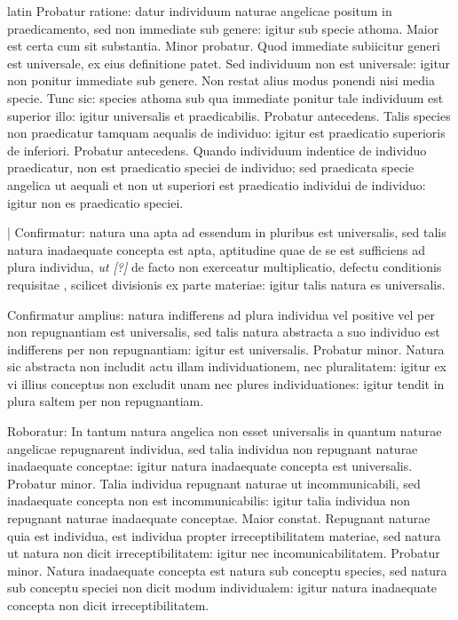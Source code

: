 \begin{otherlanguage*}{latin}
\pstart
 Probatur ratione: datur individuum naturae angelicae positum in praedicamento, sed non immediate sub genere: igitur sub specie athoma. Maior est certa cum sit substantia. Minor probatur. Quod immediate subiicitur generi est universale, ex eius definitione patet. Sed individuum non est universale: igitur non ponitur immediate sub genere. Non restat alius modus ponendi nisi media specie. Tunc sic: species athoma sub qua immediate ponitur tale individuum est superior illo: igitur universalis et praedicabilis. Probatur antecedens. Talis species non praedicatur tamquam aequalis de individuo: igitur est praedicatio superioris de inferiori. Probatur antecedens. Quando individuum indentice de individuo praedicatur, non est praedicatio speciei de individuo; sed praedicata specie angelica ut aequali et non ut superiori est praedicatio individui de individuo: igitur non es praedicatio speciei. 
\pend

\pstart
 \textnormal{|}   Confirmatur: natura una apta ad essendum  in pluribus est universalis, sed talis natura inadaequate concepta est apta, aptitudine quae de se est sufficiens ad plura individua, \emph{ut [?]} de facto non exerceatur multiplicatio, defectu conditionis requisitae , scilicet divisionis ex parte materiae: igitur talis natura es universalis. 
\pend

\pstart
 Confirmatur amplius: natura indifferens ad plura individua vel positive vel per non repugnantiam est universalis, sed talis natura abstracta a suo individuo est indifferens per non repugnantiam: igitur est universalis. Probatur minor. Natura sic abstracta non includit actu illam individuationem, nec pluralitatem: igitur ex vi illius conceptus non excludit unam nec plures individuationes: igitur tendit in plura saltem per non repugnantiam. 
\pend

\pstart
 Roboratur: In tantum natura angelica non esset universalis in quantum naturae angelicae repugnarent individua, sed talia individua non repugnant naturae inadaequate conceptae: igitur natura inadaequate concepta est universalis. Probatur minor. Talia individua repugnant naturae ut incommunicabili, sed inadaequate concepta non est incommunicabilis: igitur talia individua non repugnant naturae inadaequate conceptae. Maior constat. Repugnant naturae quia est individua, est individua propter irreceptibilitatem materiae, sed natura ut natura non dicit irreceptibilitatem: igitur nec incomunicabilitatem. Probatur minor. Natura inadaequate concepta est natura sub conceptu species, sed natura sub conceptu speciei non dicit modum individualem: igitur natura inadaequate concepta non dicit irreceptibilitatem. 
\pend


\end{otherlanguage*}
